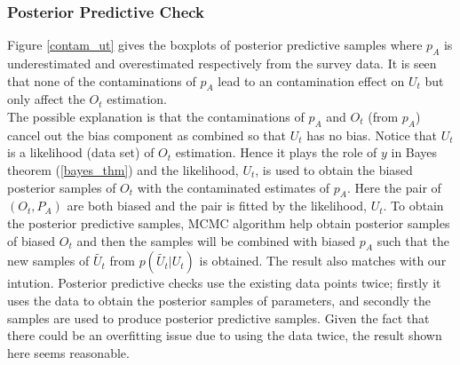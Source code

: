 \documentclass[12pt]{article}
\begin{document}
{\subsubsection{Posterior Predictive Check}

Figure \ref{contam_ut} gives the boxplots of posterior predictive samples where $p_A$ is underestimated and overestimated respectively from the survey data. It is seen that none of the contaminations of $p_A$ lead to an contamination effect on $U_t$ but only affect the $O_t$ estimation.\\

The possible explanation is that the contaminations of  $p_A$ and $O_t$ (from $p_A$) cancel out the bias component as combined so that $U_t$ has no bias. Notice that $U_t$ is a likelihood (data set) of $O_t$ estimation. Hence it plays the role of $y$ in Bayes theorem (\ref{bayes_thm}) and the likelihood, $U_t$, is used to obtain the biased posterior samples of $O_t$ with the contaminated estimates of $p_A$. Here the pair of $(O_t, P_A)$ are both biased and the pair is fitted by the likelihood, $U_t$. To obtain the posterior predictive samples, MCMC algorithm help obtain posterior samples of biased $O_t$ and then the samples will be combined with biased $p_A$ such that the new samples of $\tilde{U_t}$ from $p(\tilde{U_t}|{U_t})$ is obtained.  The result also matches with our intution. Posterior predictive checks use the existing data points twice; firstly it uses the data to obtain the posterior samples of parameters, and secondly the samples are used to produce posterior predictive samples. Given the fact that there could be an overfitting issue due to using the data twice, the result shown here seems reasonable. 
\\

}
\end{document}
